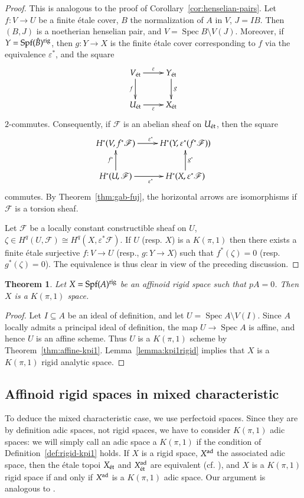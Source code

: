 \documentclass[twoside]{amsart}
\newcommand{\Ff}{\mathscr{F}}
\newcommand{\et}{{\rm\acute{e}t}}
\newcommand{\rig}{{\rm rig}}
\DeclareMathOperator{\Spec}{Spec}
\DeclareMathOperator{\Spf}{Spf}
\renewcommand{\to}{\longrightarrow}
\theoremstyle{plain}
\newtheorem{theorem}[subsubsection]{Theorem}
\theoremstyle{definition}
\theoremstyle{remark}
\numberwithin{equation}{subsection}
\begin{document}
\begin{proof}
This is analogous to the proof of Corollary~\ref{cor:henselian-pairs}. Let $f\colon V\to U$ be a finite \'etale cover, $B$ the normalization of $A$ in $V$, $J=IB$. Then $(B, J)$ is a noetherian henselian pair, and $V=\Spec B\setminus V(J)$. Moreover, if $Y=\Spf(\hat B)^\rig$, then $g\colon Y\to X$ is the finite \'etale cover corresponding to $f$ via the equivalence $\varepsilon^*$, and the square
\[ 
	\xymatrix{
		V_\et \ar[d]_{f} \ar[r]^{\varepsilon} & Y_\et \ar[d]^g \\
		U_\et \ar[r]_{\varepsilon} & X_\et
	}
\]
$2$-commutes. Consequently, if $\Ff$ is an abelian sheaf on $U_\et$, then the square
\[ 
	\xymatrix{
		H^*(V, f^* \Ff) \ar[r]^{\varepsilon^*} & H^*(Y, \varepsilon^* (f^* \Ff)) \\
		H^*(U, \Ff)\ar[r]_{\varepsilon^*} \ar[u]^{f^*} & H^*(X, \varepsilon^*\Ff) \ar[u]_{g^*}
	}
\]
commutes. By Theorem~\ref{thm:gab-fuj}, the horizontal arrows are isomorphisms if $\Ff$ is a torsion sheaf.

Let $\Ff$ be a locally constant constructible sheaf on $U$, $\zeta\in H^q(U, \Ff)\cong H^q(X, \varepsilon^* \Ff)$. If $U$ (resp. $X$) is a $K(\pi, 1)$ then there exists a finite \'etale surjective $f\colon V\to U$ (resp., $g\colon Y\to X$) such that $f^*(\zeta)=0$ (resp. $g^*(\zeta)=0$). The equivalence is thus clear in view of the preceding discussion.
\end{proof}

\begin{theorem} \label{thm:kpi1-affinoid-char-p}
	Let $X=\Spf(A)^\rig$ be an affinoid rigid space such that $pA=0$. Then $X$ is a $K(\pi, 1)$ space.
\end{theorem}

\begin{proof}
	 Let $I\subseteq A$ be an ideal of definition, and let $U=\Spec A \setminus V(I)$. Since $A$ locally admits a principal ideal of definition, the map $U\to \Spec A$ is affine, and hence $U$ is an affine scheme. Thus $U$ is a $K(\pi, 1)$ scheme by Theorem~\ref{thm:affine-kpi1}. Lemma~\ref{lemma:kpi1rigid} implies that $X$ is a $K(\pi, 1)$ rigid analytic space.
\end{proof}

\subsection{Affinoid rigid spaces in mixed characteristic} 

To deduce the mixed characteristic case, we use perfectoid spaces. Since they are by definition adic spaces, not rigid spaces, we have to consider $K(\pi, 1)$ adic spaces: we will simply call an adic space a $K(\pi, 1)$ if the condition of Definition~\ref{def:rigid-kpi1} holds. If $X$ is a rigid space, $X^{\rm ad}$ the associated adic space, then the \'etale topoi $X_\et$ and $X^{\rm ad}_\et$ are equivalent (cf. \cite[Proposition~2.1.4]{Huber}), and $X$ is a $K(\pi, 1)$ rigid space if and only if $X^{\rm ad}$ is a $K(\pi, 1)$ adic space. Our argument is analogous to \cite[Theorem~4.9]{ScholzePAdic}. 
\end{document}
